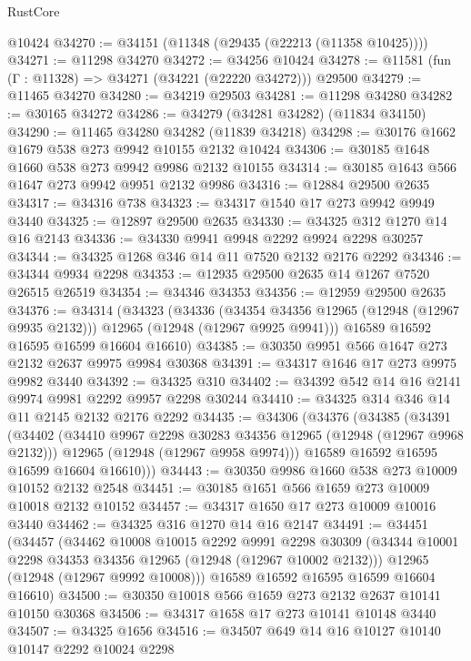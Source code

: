 \begin{lexlean}{RustCore}
\begin{coremodule}
    @10424
@34270 := @34151 (@11348 (@29435 (@22213 (@11358 @10425))))
@34271 := @11298 @34270
@34272 := @34256 @10424
@34278 := @11581 (fun (Γ : @11328) => @34271 (@34221 (@22220 @34272))) @29500
@34279 := @11465 @34270
@34280 := @34219 @29503
@34281 := @11298 @34280
@34282 := @30165 @34272
@34286 := @34279 (@34281 @34282) (@11834 @34150)
@34290 := @11465 @34280 @34282 (@11839 @34218)
@34298 := @30176 @1662 @1679 @538 @273 @9942 @10155 @2132 @10424
@34306 := @30185 @1648 @1660 @538 @273 @9942 @9986 @2132 @10155
@34314 := @30185 @1643 @566 @1647 @273 @9942 @9951 @2132 @9986
@34316 := @12884 @29500 @2635
@34317 := @34316 @738
@34323 := @34317 @1540 @17 @273 @9942 @9949 @3440
@34325 := @12897 @29500 @2635
@34330 := @34325 @312 @1270 @14 @16 @2143
@34336 := @34330 @9941 @9948 @2292 @9924 @2298 @30257
@34344 := @34325 @1268 @346 @14 @11 @7520 @2132 @2176 @2292
@34346 := @34344 @9934 @2298
@34353 := @12935 @29500 @2635 @14 @1267 @7520 @26515 @26519
@34354 := @34346 @34353
@34356 := @12959 @29500 @2635
@34376 := @34314
    (@34323
      (@34336
        (@34354 @34356 @12965 (@12948 (@12967 @9935 @2132)))
        @12965
        (@12948 (@12967 @9925 @9941)))
      @16589
      @16592
      @16595
      @16599
      @16604
      @16610)
@34385 := @30350 @9951 @566 @1647 @273 @2132 @2637 @9975 @9984 @30368
@34391 := @34317 @1646 @17 @273 @9975 @9982 @3440
@34392 := @34325 @310
@34402 := @34392 @542 @14 @16 @2141 @9974 @9981 @2292 @9957 @2298 @30244
@34410 := @34325 @314 @346 @14 @11 @2145 @2132 @2176 @2292
@34435 := @34306
    (@34376
      (@34385
        (@34391
          (@34402
            (@34410 @9967 @2298 @30283 @34356 @12965 (@12948 (@12967 @9968 @2132)))
            @12965
            (@12948 (@12967 @9958 @9974)))
          @16589
          @16592
          @16595
          @16599
          @16604
          @16610)))
@34443 := @30350 @9986 @1660 @538 @273 @10009 @10152 @2132 @2548
@34451 := @30185 @1651 @566 @1659 @273 @10009 @10018 @2132 @10152
@34457 := @34317 @1650 @17 @273 @10009 @10016 @3440
@34462 := @34325 @316 @1270 @14 @16 @2147
@34491 := @34451
    (@34457
      (@34462
        @10008
        @10015
        @2292
        @9991
        @2298
        @30309
        (@34344 @10001 @2298 @34353 @34356 @12965 (@12948 (@12967 @10002 @2132)))
        @12965
        (@12948 (@12967 @9992 @10008)))
      @16589
      @16592
      @16595
      @16599
      @16604
      @16610)
@34500 := @30350 @10018 @566 @1659 @273 @2132 @2637 @10141 @10150 @30368
@34506 := @34317 @1658 @17 @273 @10141 @10148 @3440
@34507 := @34325 @1656
@34516 := @34507 @649 @14 @16 @10127 @10140 @10147 @2292 @10024 @2298

\end{coremodule}
\end{lexlean}
